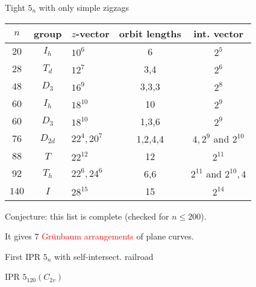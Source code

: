 \documentclass[%
pdf,
colorBG,
slideColor,
]{prosper}
\begin{document}
\begin{slide}{Tight $5_n$ with only simple zigzags}
{\scriptsize
\begin{center}
\begin{tabular}{||c|c|l|c|c||}
\hline
\hline
$n$       &group          &$z$-vector     &orbit lengths  &int. vector\\
\hline \hline
$20$    &$I_h$          &$10^6$         &6              &$2^5$ \\
$28$    &$T_d$          &$12^7$         &3,4            &$2^6$\\
$48$    &$D_3$          &$16^9$         &3,3,3          &$2^8$\\
$60$    &$I_h$          &$18^{10}$      &10             &$2^9$\\
$60$    &$D_3$          &$18^{10}$      &1,3,6          &$2^9$\\
$76$    &$D_{2d}$       &$22^4,20^7$    &1,2,4,4        &$4,2^9$ and $2^{10}$\\
$88$    &$T$            &$22^{12}$      &12             &$2^{11}$\\
$92$    &$T_h$          &$22^6, 24^6$   &6,6            &$2^{11}$ and $2^{10}, 4$\\
$140$   &$I$            &$28^{15}$      &15             &$2^{14}$\\
\hline
\hline
\end{tabular}
\end{center}
}
Conjecture: this list is complete (checked for $n\leq 200$).

It gives $7$ \textcolor{red}{Gr\"unbaum arrangements} of plane curves.

\end{slide}




\begin{slide}{First IPR $5_n$ with self-intersect. railroad}
\begin{center}
\centering
{}\par
\end{center}
\end{slide}

\begin{slide}{IPR $5_{120}(C_{2v})$}
\begin{center}
\centering
{}\par
\end{center}
\end{slide}
\end{document}
